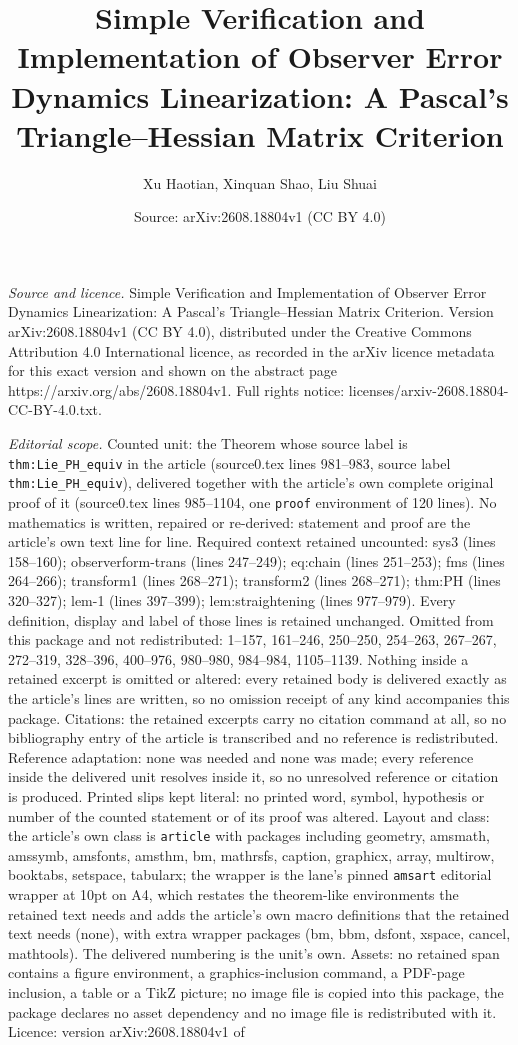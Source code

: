 \documentclass[10pt,a4paper]{amsart}
\title[Simple Verification and Implementation of Observer Error Dyn]{Simple Verification and Implementation of Observer Error Dynamics Linearization: A Pascal's Triangle--Hessian Matrix Criterion}
\author{Xu Haotian, Xinquan Shao, Liu Shuai}
\date{Source: arXiv:2608.18804v1 (CC BY 4.0)}
\begin{document}
\maketitle

\noindent\emph{Source and licence.} Simple Verification and Implementation of Observer Error Dynamics Linearization: A Pascal's Triangle--Hessian Matrix Criterion. Version arXiv:2608.18804v1 (CC BY 4.0), distributed under the Creative Commons Attribution 4.0 International licence, as recorded in the arXiv licence metadata for this exact version and shown on the abstract page https://arxiv.org/abs/2608.18804v1. Full rights notice: licenses/arxiv-2608.18804-CC-BY-4.0.txt.\par\smallskip

\noindent\textit{Editorial scope.} Counted unit: the Theorem whose source label is \texttt{thm:Lie\_PH\_equiv} in the article (source0.tex lines 981--983, source label \texttt{thm:Lie\_PH\_equiv}), delivered together with the article's own complete original proof of it (source0.tex lines 985--1104, one \texttt{proof} environment of 120 lines). No mathematics is written, repaired or re-derived: statement and proof are the article's own text line for line. Required context retained uncounted: sys3 (lines 158--160); observerform-trans (lines 247--249); eq:chain (lines 251--253); fms (lines 264--266); transform1 (lines 268--271); transform2 (lines 268--271); thm:PH (lines 320--327); lem-1 (lines 397--399); lem:straightening (lines 977--979). Every definition, display and label of those lines is retained unchanged. Omitted from this package and not redistributed: 1--157, 161--246, 250--250, 254--263, 267--267, 272--319, 328--396, 400--976, 980--980, 984--984, 1105--1139. Nothing inside a retained excerpt is omitted or altered: every retained body is delivered exactly as the article's lines are written, so no omission receipt of any kind accompanies this package. Citations: the retained excerpts carry no citation command at all, so no bibliography entry of the article is transcribed and no reference is redistributed. Reference adaptation: none was needed and none was made; every reference inside the delivered unit resolves inside it, so no unresolved reference or citation is produced. Printed slips kept literal: no printed word, symbol, hypothesis or number of the counted statement or of its proof was altered. Layout and class: the article's own class is \texttt{article} with packages including geometry, amsmath, amssymb, amsfonts, amsthm, bm, mathrsfs, caption, graphicx, array, multirow, booktabs, setspace, tabularx; the wrapper is the lane's pinned \texttt{amsart} editorial wrapper at 10pt on A4, which restates the theorem-like environments the retained text needs and adds the article's own macro definitions that the retained text needs (none), with extra wrapper packages (bm, bbm, dsfont, xspace, cancel, mathtools). The delivered numbering is the unit's own. Assets: no retained span contains a figure environment, a graphics-inclusion command, a PDF-page inclusion, a table or a TikZ picture; no image file is copied into this package, the package declares no asset dependency and no image file is redistributed with it. Licence: version arXiv:2608.18804v1 of 
\end{document}
